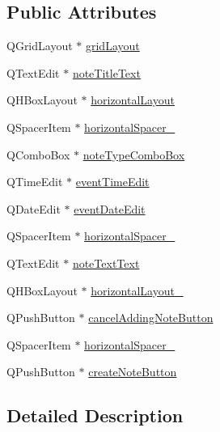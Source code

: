 \subsection*{Public Attributes}
\begin{DoxyCompactItemize}
\item 
Q\+Grid\+Layout $\ast$ \hyperlink{classUi__addNoteDialog_a8e3a587de2697e28e5c06232ae12a27f}{grid\+Layout}
\item 
Q\+Text\+Edit $\ast$ \hyperlink{classUi__addNoteDialog_ab6a4a2b756400a734bf7f4d786aa8d20}{note\+Title\+Text}
\item 
Q\+H\+Box\+Layout $\ast$ \hyperlink{classUi__addNoteDialog_aee7483b969d780e610d025a38849298c}{horizontal\+Layout}
\item 
Q\+Spacer\+Item $\ast$ \hyperlink{classUi__addNoteDialog_a790839063730f8529b1ee5c38bcea903}{horizontal\+Spacer\+\_}
\item 
Q\+Combo\+Box $\ast$ \hyperlink{classUi__addNoteDialog_acf0ac47d3c4f567ca69a17769d35409d}{note\+Type\+Combo\+Box}
\item 
Q\+Time\+Edit $\ast$ \hyperlink{classUi__addNoteDialog_a6c1f24a74ed0a88961136db719c3ae4e}{event\+Time\+Edit}
\item 
Q\+Date\+Edit $\ast$ \hyperlink{classUi__addNoteDialog_adb9af8a9610aaea19686f07c381095a4}{event\+Date\+Edit}
\item 
Q\+Spacer\+Item $\ast$ \hyperlink{classUi__addNoteDialog_a5c9351b134e471dcf8256461f2e5edb3}{horizontal\+Spacer\+\_}
\item 
Q\+Text\+Edit $\ast$ \hyperlink{classUi__addNoteDialog_a2f452da1121f801c554ea1d45b776c6b}{note\+Text\+Text}
\item 
Q\+H\+Box\+Layout $\ast$ \hyperlink{classUi__addNoteDialog_a887453602e2364b3972cf6b0512210c9}{horizontal\+Layout\+\_}
\item 
Q\+Push\+Button $\ast$ \hyperlink{classUi__addNoteDialog_a600ac0c5310ee52416b8fa3ff1e1142e}{cancel\+Adding\+Note\+Button}
\item 
Q\+Spacer\+Item $\ast$ \hyperlink{classUi__addNoteDialog_a2e0afdb4de479696f7488193836420bd}{horizontal\+Spacer\+\_}
\item 
Q\+Push\+Button $\ast$ \hyperlink{classUi__addNoteDialog_a095d7b7256d2a2449943e7c4f0afa209}{create\+Note\+Button}
\end{DoxyCompactItemize}


\subsection{Detailed Description}


